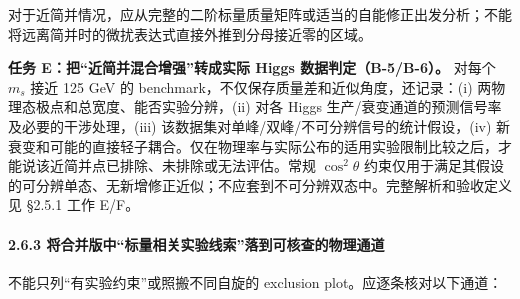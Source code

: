 \documentclass[
  chinese,
  UTF8]{ctexart}
\begin{document}
对于近简并情况，应从完整的二阶标量质量矩阵或适当的自能修正出发分析；不能将远离简并时的微扰表达式直接外推到分母接近零的区域。

\textbf{任务 E：把``近简并混合增强''转成实际 Higgs
数据判定（B-5/B-6）。} 对每个 \(m_s\) 接近 125 GeV 的
benchmark，不仅保存质量差和近似角度，还记录：(i)
两物理态极点和总宽度、能否实验分辨，(ii) 对各 Higgs
生产/衰变通道的预测信号率及必要的干涉处理，(iii)
该数据集对单峰/双峰/不可分辨信号的统计假设，(iv)
新衰变和可能的直接轻子耦合。仅在物理率与实际公布的适用实验限制比较之后，才能说该近简并点已排除、未排除或无法评估。常规
\(\cos^2\theta\)
约束仅用于满足其假设的可分辨单态、无新增修正近似；不应套到不可分辨双态中。完整解析和验收定义见
§2.5.1 工作 E/F。

\paragraph{2.6.3
将合并版中``标量相关实验线索''落到可核查的物理通道}\label{ux5c06ux5408ux5e76ux7248ux4e2dux6807ux91cfux76f8ux5173ux5b9eux9a8cux7ebfux7d22ux843dux5230ux53efux6838ux67e5ux7684ux7269ux7406ux901aux9053}

不能只列``有实验约束''或照搬不同自旋的 exclusion
plot。应逐条核对以下通道：
\end{document}
